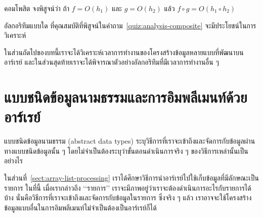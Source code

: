 \begin{quiz}{คอม{\wbr}โพ{\wbr}สิ{\wbr}ต}
\label{quiz:analysis-composite}
จง{\wbr}พิสูจน์{\wbr}ว่า ถ้า $f=O(h_1)$ และ $g=O(h_2)$ แล้ว $f\circ g = O(h_1\circ h_2)$
\end{quiz}

\begin{quiz}{}
อัล{\wbr}กอ{\wbr}ริ{\wbr}ทึม{\wbr}แบบ{\wbr}ใด ที่{\wbr}คุณสมบัติ{\wbr}ที่{\wbr}พิสูจน์{\wbr}ใน{\wbr}คำถาม~\ref{quiz:analysis-composite}
จะ{\wbr}มี{\wbr}ประโยชน์{\wbr}ใน{\wbr}การ{\wbr}วิเคราะห์{\wbr}
\end{quiz}

ใน{\wbr}ส่วน{\wbr}ถัด{\wbr}ไป{\wbr}ของ{\wbr}บท{\wbr}นี้{\wbr}เรา{\wbr}จะ{\wbr}ได้{\wbr}วิเคราะห์{\wbr}เวลา{\wbr}การ{\wbr}ทำงาน{\wbr}ของ{\wbr}โครงสร้าง{\wbr}ข้อมูล{\wbr}หลาย{\wbr}แบบ{\wbr}ที่{\wbr}พัฒนา{\wbr}บน{\wbr}อาร์เรย์
และ{\wbr}ใน{\wbr}ส่วน{\wbr}สุดท้าย{\wbr}เรา{\wbr}จะ{\wbr}ได้{\wbr}พิจารณา{\wbr}ตัวอย่าง{\wbr}อัล{\wbr}กอ{\wbr}ริ{\wbr}ทึม{\wbr}ที่{\wbr}มี{\wbr}เวลา{\wbr}การ{\wbr}ทำงาน{\wbr}อื่น ๆ

\section{แบบ{\wbr}ชนิด{\wbr}ข้อมูล{\wbr}นามธรรม{\wbr}และ{\wbr}การ{\wbr}อิม{\wbr}พลี{\wbr}เมนท์{\wbr}ด้วย{\wbr}อาร์เรย์}

แบบ{\wbr}ชนิด{\wbr}ข้อมูล{\wbr}นามธรรม (abstract data types)
ระบุ{\wbr}วิธีการ{\wbr}ที่{\wbr}เรา{\wbr}จะ{\wbr}เข้าถึง{\wbr}และ{\wbr}จัดการ{\wbr}กับ{\wbr}ข้อมูล{\wbr}ผ่าน{\wbr}ทาง{\wbr}แบบ{\wbr}ชนิด{\wbr}ข้อมูล{\wbr}นั้น ๆ
โดย{\wbr}ไม่{\wbr}จำเป็น{\wbr}ต้อง{\wbr}ระบุ{\wbr}ว่า{\wbr}ขั้นตอน{\wbr}ดำเนินการ{\wbr}จริง ๆ ของ{\wbr}วิธีการ{\wbr}เหล่านั้น{\wbr}เป็น{\wbr}อย่างไร{\wbr}

ใน{\wbr}ส่วน{\wbr}ที่~\ref{sect:array-list-processing}
เรา{\wbr}ได้{\wbr}ศึกษา{\wbr}วิธีการ{\wbr}นำ{\wbr}อาร์เรย์{\wbr}ไป{\wbr}ใช้{\wbr}เก็บ{\wbr}ข้อมูล{\wbr}ที่{\wbr}มี{\wbr}ลักษณะ{\wbr}เป็น{\wbr}รายการ ใน{\wbr}ที่นี้ เมื่อ{\wbr}เรา{\wbr}กล่าว{\wbr}ถึง{\wbr}
`{\wbr}`{\wbr}รายการ'' เรา{\wbr}จะ{\wbr}มี{\wbr}ภาพ{\wbr}อยู่{\wbr}ว่า{\wbr}เรา{\wbr}จะ{\wbr}ต้อง{\wbr}ดำเนินการ{\wbr}อะไร{\wbr}กับ{\wbr}รายการ{\wbr}ได้{\wbr}บ้าง{\wbr}
นั่น{\wbr}คือ{\wbr}วิธีการ{\wbr}ที่{\wbr}เรา{\wbr}จะ{\wbr}เข้าถึง{\wbr}และ{\wbr}จัดการ{\wbr}กับ{\wbr}ข้อมูล{\wbr}ใน{\wbr}รายการ ซึ่ง{\wbr}จริง ๆ แล้ว{\wbr}
เรา{\wbr}อาจ{\wbr}จะ{\wbr}ใช้{\wbr}โครงสร้าง{\wbr}ข้อมูล{\wbr}แบบ{\wbr}อื่น{\wbr}ใน{\wbr}การ{\wbr}อิม{\wbr}พลี{\wbr}เมนท์{\wbr}ไม่{\wbr}จำเป็น{\wbr}ต้อง{\wbr}เป็น{\wbr}อาร์เรย์{\wbr}ก็ได้{\wbr}

